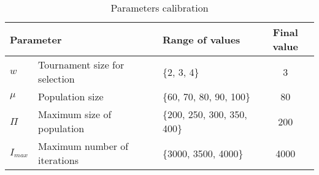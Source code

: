 \begin{table}[!h]
\centering
\begin{tabular}{@{}lllc@{}}
\toprule
\multicolumn{2}{l}{Parameter}           & Range of values             & Final value \\ \midrule
$w$     & Tournament size for selection & \{2, 3, 4\}                 & 3           \\
$\mu$   & Population size               & \{60, 70, 80, 90, 100\}     & 80          \\
$\Pi$   & Maximum size of population    & \{200, 250, 300, 350, 400\} & 200         \\
$I_{max}$ & Maximum number of iterations  & \{3000, 3500, 4000\}        & 4000        \\ \bottomrule
\end{tabular}
\caption{Parameters calibration}
\label{calibration}
\end{table}
